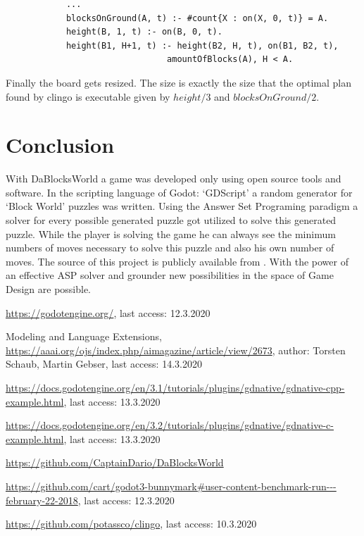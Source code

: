 \documentclass[runningheads]{llncs}
\begin{document}
        \begin{lstlisting}[caption=Addition to the encoding, label=modification]
            %DEFINE
            ...
            blocksOnGround(A, t) :- #count{X : on(X, 0, t)} = A.
            height(B, 1, t) :- on(B, 0, t).
            height(B1, H+1, t) :- height(B2, H, t), on(B1, B2, t),
                                amountOfBlocks(A), H < A.
        \end{lstlisting}
        
        Finally the board gets resized.
        The size is exactly the size that the optimal plan found by clingo is executable given by $height/3$ and $blocksOnGround/2$.

\section{Conclusion}
With DaBlocksWorld \cite{daBlocksWorldGithub} a game was developed only using open source tools and software.
In the scripting language of Godot: `GDScript' a random generator for `Block World' puzzles was written.
Using the Answer Set Programing paradigm a solver for every possible generated puzzle got utilized to solve this generated puzzle.
While the player is solving the game he can always see the minimum numbers of moves necessary to solve this puzzle and also his own number of moves.\newline
The source of this project is publicly available from \cite{daBlocksWorldGithub}.\newline
With the power of an effective ASP solver and grounder new possibilities in the space of Game Design are possible. 


\begin{thebibliography}{8}

        \url{https://godotengine.org/},
        last access: 12.3.2020

        Modeling and Language Extensions,
        \url{https://aaai.org/ojs/index.php/aimagazine/article/view/2673},
        author: Torsten Schaub, Martin Gebser,
        last access: 14.3.2020

        \url{https://docs.godotengine.org/en/3.1/tutorials/plugins/gdnative/gdnative-cpp-example.html},
        last access: 13.3.2020

        \url{https://docs.godotengine.org/en/3.2/tutorials/plugins/gdnative/gdnative-c-example.html},
        last access: 13.3.2020

        \url{https://github.com/CaptainDario/DaBlocksWorld}

        \url{https://github.com/cart/godot3-bunnymark#user-content-benchmark-run---february-22-2018},
        last access: 12.3.2020

        \url{https://github.com/potassco/clingo},
        last access: 10.3.2020

\end{thebibliography}
\end{document}
